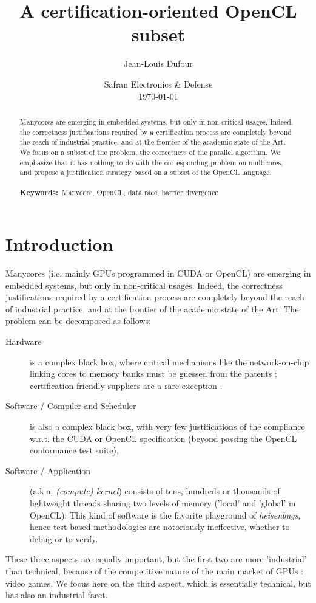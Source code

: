 \documentclass[a4paper,10pt]{article} %
\title{A certification-oriented OpenCL subset}
\author{Jean-Louis Dufour}
\date{Safran Electronics \& Defense\\
\today
}
\begin{document}
\maketitle

\begin{abstract}
Manycores are emerging in embedded systems, but only in non-critical usages.
Indeed, the correctness justifications required by a certification process are completely beyond the reach of industrial practice,
and at the frontier of the academic state of the Art.
We focus on a subset of the problem, the correctness of the parallel algorithm.
We emphasize that it has nothing to do with the corresponding problem on multicores,
and propose a justification strategy based on a subset of the OpenCL language.
\\\\
\textbf{Keywords:}\ Manycore, OpenCL, data race, barrier divergence
\end{abstract}



\section{Introduction}

Manycores (i.e. mainly GPUs programmed in CUDA or OpenCL) are emerging in embedded systems, but only in non-critical usages.
Indeed, the correctness justifications required by a certification process are completely beyond the reach of industrial practice,
and at the frontier of the academic state of the Art.
The problem can be decomposed as follows:
\begin{description}
\item[Hardware] is a complex black box, where critical mechanisms like the network-on-chip linking cores to memory banks must be guessed from the patents  \cite{aamodt2018general}; certification-friendly suppliers are a rare exception \cite{boyer2018computing}.
\item[Software / Compiler-and-Scheduler] is also a complex black box, with very few justifications of the compliance w.r.t. the CUDA or OpenCL specification (beyond passing the OpenCL conformance test suite),
\item[Software / Application] (a.k.a. \emph{(compute) kernel}) consists of tens, hundreds or thousands of lightweight threads sharing two levels of memory ('local' and 'global' in OpenCL). This kind of software is the favorite playground of \emph{heisenbugs}, hence test-based methodologies are notoriously ineffective, whether to debug or to verify.
\end{description}
These three aspects are equally important, but the first two are more 'industrial' than technical, because of the competitive nature of the main market of GPUs : video games. We focus here on the third aspect, which is essentially technical, but has also an industrial facet.
\end{document}

